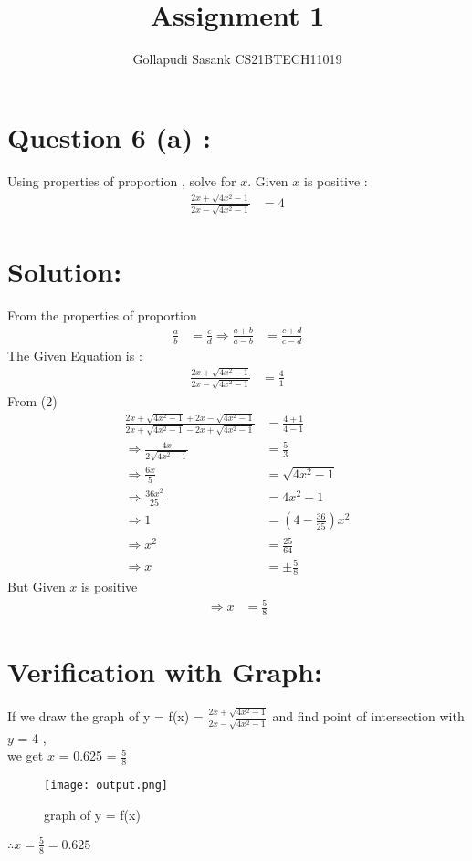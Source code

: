 \documentclass[twocolumn]{article}
\title{Assignment 1}
\author{Gollapudi Sasank CS21BTECH11019}
\providecommand{\brak}[1]{\ensuremath{\left(#1\right)}}
\begin{document}
\maketitle
\section*{ Question 6 (a) :}
\noindent Using properties of proportion , solve for $x$. Given $x$ is positive :
\begin{align}
\frac{2x+\sqrt{4x^2-1}}{2x-\sqrt{4x^2-1}} &= 4 
\end{align}
\section*{Solution:}
From the properties of proportion
\begin{align}
     \frac{a}{b}  &=  \frac{c}{d} 
     \Rightarrow 
     \frac{a+b}{a-b} &= \frac{c+d}{c-d}
     \end{align}
The Given Equation is :
    \begin{align}
        \frac{2x+\sqrt{4x^2-1}}{2x-\sqrt{4x^2-1}} &= \frac {4}{1}
        \end{align}
    From (2) 
    \begin{align}
      \frac {2x+\sqrt{4x^2-1}+2x-\sqrt{4x^2-1}}{2x+\sqrt{4x^2-1}-2x+\sqrt{4x^2-1}} &= \frac {4+1}{4-1} \\ \Rightarrow
        \frac{4x}{2\sqrt{4x^2-1}} &= \frac {5}{3} \\   \Rightarrow
        \frac{6x}{5} &= \sqrt{4x^2-1} \\  \Rightarrow
        \frac{36x^2}{25} &= 4x^2-1 \\   \Rightarrow
         1 &= \brak {4 - \frac{36}{25}}x^2 \\   \Rightarrow
        x^2 &=\frac{25}{64} \\   \Rightarrow
        x &= \pm\frac{5}{8} 
    \end{align}
But Given $x$ is positive 
\begin{align}
   \Rightarrow x &= \frac{5}{8}  
   \end{align}
\section*{Verification with Graph:} 
If we draw the graph of 
y = f(x) = $\frac{2x+\sqrt{4x^2-1}}{2x-\sqrt{4x^2-1}}$
 and find point of intersection with $y$ = 4 ,\\ we get $x$ = 0.625 = $\frac{5}{8}$ \\    
\begin{figure}[h]  
\texttt{[image: output.png]}
\caption{graph of y = f(x)}
\end{figure}
$\therefore x = \frac{5}{8} = 0.625 $
\end{document}
